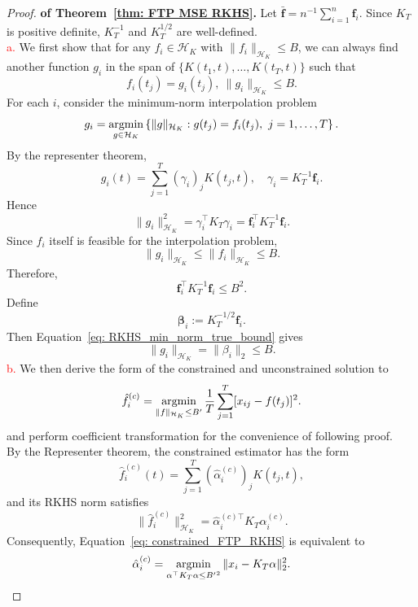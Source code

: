 \begin{proof}\textbf{of Theorem~\ref{thm: FTP MSE RKHS}.}
Let $\bar{\mathbf f}=n^{-1}\sum_{i=1}^n\mathbf f_i$. Since $K_T$ is positive definite, $K_T^{-1}$ and $K_T^{1/2}$ are well-defined.\\
\textcolor{red}{a.} 
We first show that for any $f_i\in \mathcal{H}_K$ with $\|f_i\|_{\mathcal{H}_K}\leq B$, we can always find another function $g_i$ in the span of $\{K(t_1,t),\ldots,K(t_T,t)\}$ such that 
\[
f_i(t_j)=g_i(t_j),\ \|g_i\|_{\mathcal{H}_K}\leq B.
\]
For each $i$, consider the minimum-norm interpolation problem
\[
g_i
=
\operatorname*{argmin}_{g\in\mathcal H_K}
\left\{
\|g\|_{\mathcal H_K}:
g(t_j)=f_i(t_j),\ j=1,\ldots,T
\right\}.
\]
By the representer theorem,
\[
g_i(t)
=
\sum_{j=1}^T
(\gamma_i)_jK(t_j,t),
\quad
\gamma_i=K_T^{-1}\mathbf f_i.
\]
Hence
\[
\|g_i\|_{\mathcal H_K}^2
=
\gamma_i^\top K_T\gamma_i
=
\mathbf f_i^\top K_T^{-1}\mathbf f_i.
\]
Since $f_i$ itself is feasible for the interpolation problem,
\[
\|g_i\|_{\mathcal H_K}
\le
\|f_i\|_{\mathcal H_K}
\le B.
\]
Therefore,
\begin{equation}
\mathbf f_i^\top K_T^{-1}\mathbf f_i
\le B^2.
\label{eq: RKHS_min_norm_true_bound}
\end{equation}
Define
\[
\mathbf \beta_i
:=
K_T^{-1/2}\mathbf f_i.
\]
Then Equation~\eqref{eq: RKHS_min_norm_true_bound} gives
\begin{equation}
\|g_i\|_{\mathcal H_K} = \|\beta_i\|_2\le B.
\label{eq:true_transformed_norm}
\end{equation}
\textcolor{red}{b.} 
We then derive the form of the constrained and unconstrained solution to \begin{equation}
    \hat{f}_i^{(c)} 
    = \operatorname*{argmin}_{\|f\|_{\mathcal{H}_K}\le B'} 
    \dfrac{1}{T}\sum_{j=1}^T [x_{ij}-f(t_j)]^2.
\label{eq: constrained_FTP_RKHS}
\end{equation}
and perform coefficient transformation for the convenience of following proof.\\ 
By the Representer theorem, the constrained estimator has the form
\[
\hat f_i^{(c)}(t)
=
\sum_{j=1}^T
(\hat\alpha_i^{(c)})_jK(t_j,t),
\]
and its RKHS norm satisfies
\[
\|\hat f_i^{(c)}\|_{\mathcal H_K}^2
=
\hat\alpha_i^{(c)\top}
K_T
\hat\alpha_i^{(c)}.
\]
Consequently, Equation~\eqref{eq: constrained_FTP_RKHS} is equivalent to
\begin{equation}
    \hat\alpha_i^{(c)}
    =
    \operatorname*{argmin}_{\alpha^\top K_T\alpha\le {B'}^2}
    \|x_i-K_T\alpha\|_2^2.
    \label{eq: constrained_alpha_RKHS}
\end{equation}

\end{proof}
